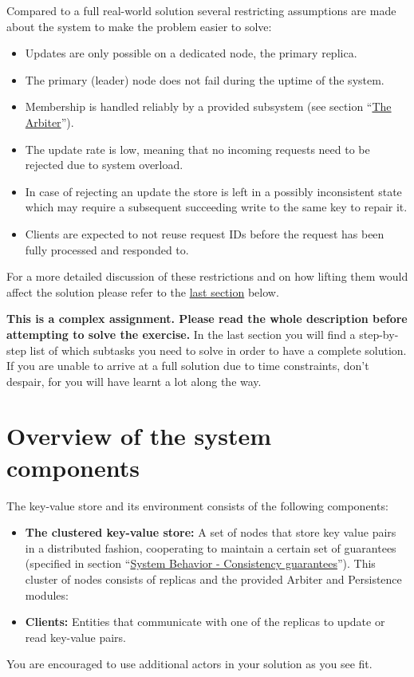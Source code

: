 \documentclass{article}
\begin{document}
Compared to a full real-world solution several restricting assumptions are made about the system to make the problem easier to solve:

\begin{itemize}
  \item Updates are only possible on a dedicated node, the primary replica.
  \item The primary (leader) node does not fail during the uptime of the system.
  \item Membership is handled reliably by a provided subsystem (see section ``\hyperref[s:arbiter]{The Arbiter}'').
  \item The update rate is low, meaning that no incoming requests need to be rejected due to system overload.
  \item In case of rejecting an update  the store is left in a possibly inconsistent state which may require a subsequent succeeding write to the same key to repair it.
  \item Clients are expected to not reuse request IDs before the request has been fully processed and responded to.
\end{itemize}

For a more detailed discussion of these restrictions and on how lifting them would affect the solution please refer to the \hyperref[ss:theeffectoftherestrictions]{last section} below.

\textbf{This is a complex assignment. Please read the whole description before attempting to solve the exercise.} In the last section you will find a step-by-step list of which subtasks you need to solve in order to have a complete solution. If you are unable to arrive at a full solution due to time constraints, don’t despair, for you will have learnt a lot along the way.

\section{Overview of the system components}\label{s:overview}

The key-value store and its environment consists of the following components:
\begin{itemize}
  \item \textbf{The clustered key-value store:} A set of nodes that store key value pairs in a distributed fashion, cooperating to maintain a certain set of guarantees (specified in section ``\hyperref[s:systembehavior]{System Behavior - Consistency guarantees}''). This cluster of nodes consists of replicas and the provided Arbiter and Persistence modules:

  \item \textbf{Clients:} Entities that communicate with one of the replicas to update or read key-value pairs.
\end{itemize}
You are encouraged to use additional actors in your solution as you see fit.
\end{document}
